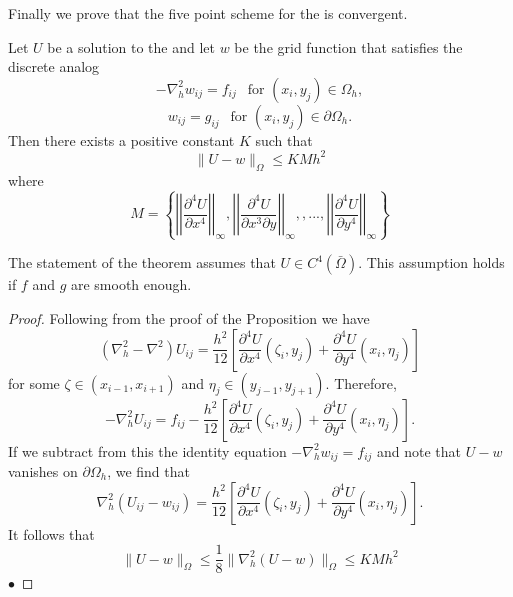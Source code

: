 Finally we prove that the five point scheme for the  is convergent.
\begin{theorem}
Let $U$ be a solution to the  and let $w$ be the grid function
that satisfies the discrete analog
\[-\nabla_h^2w_{ij}=f_{ij} \ \ \mbox{ for } (x_i,y_j)\in\Omega_h, \]
\[w_{ij}=g_{ij} \ \ \mbox{ for } (x_i,y_j)\in\partial\Omega_h. \]
Then there exists a positive constant $K$ such that
\[\lVert U-w\rVert_{\Omega}\leq KMh^2 \]
where
\[ M=\left\{
\left|\left|\frac{\partial^4 U}{\partial x^4} \right|\right|_{\infty},
\left|\left|\frac{\partial^4 U}{\partial x^3\partial y} \right|\right|_{\infty},
,...,
\left|\left|\frac{\partial^4 U}{\partial y^4} \right|\right|_{\infty}
 \right\}
\]
\end{theorem}
The statement of the theorem assumes that $U\in C^4(\bar{\Omega})$. This assumption
holds if $f$ and $g$ are smooth enough.
\begin{proof}
Following from the proof of the Proposition we have
\[ (\nabla_h^2-\nabla^2)U_{ij}=\frac{h^2}{12}\left[ \frac{\partial^4 U}{\partial x^4}(\zeta_i,y_j)+\frac{\partial^4 U}{\partial y^4}(x_i,\eta_j) \right]\]
for some $\zeta \in (x_{i-1},x_{i+1})$ and $\eta_j\in(y_{j-1},y_{j+1})$.  Therefore,
\[ -\nabla_h^2U_{ij}=f_{ij}-\frac{h^2}{12}\left[ \frac{\partial^4 U}{\partial x^4}(\zeta_i,y_j)+\frac{\partial^4 U}{\partial y^4}(x_i,\eta_j) \right].\]
If we subtract from this the identity equation $-\nabla_h^2w_{ij}=f_{ij}$ and note
that $U-w$ vanishes on $\partial\Omega_h$, we find that
\[ \nabla_h^2(U_{ij}-w_{ij})=\frac{h^2}{12}\left[ \frac{\partial^4 U}{\partial x^4}(\zeta_i,y_j)+\frac{\partial^4 U}{\partial y^4}(x_i,\eta_j) \right].\]
It follows that
\[ \lVert U-w\rVert_{\Omega}\leq\frac{1}{8}\lVert \nabla_h^2(U-w)\rVert_{\Omega}\leq KMh^2\]
$\bullet$\end{proof}